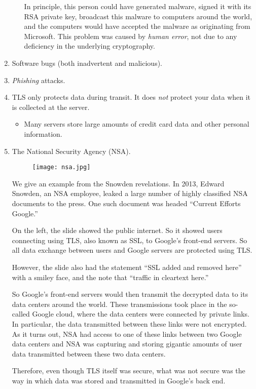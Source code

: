 \begin{enumerate}
\begin{itemize}
                        {\color{blue}In principle, this person could have generated malware,
                            signed it with its RSA private key, broadcast this malware to computers around
                            the world, and the computers would have accepted the malware as originating
                            from Microsoft. This problem was caused by \emph{human error}, not due to any
                            deficiency in the underlying cryptography.}
          \end{itemize}
    \item Software bugs (both inadvertent and malicious).
    \item \emph{Phishing} attacks.
    \item TLS only protects data during transit. It does
          \emph{not} protect your data when it is collected at the server.
          \begin{itemize}
              \item Many servers store large amounts of credit card data and other
                    personal information.
          \end{itemize}
    \item The National Security Agency (NSA).

          \begin{figure}[!ht]
              \centering
              \texttt{[image: nsa.jpg]}
          \end{figure}

          {\color{blue} We give an example from the Snowden revelations. In
          2013, Edward Snowden, an NSA employee, leaked a large number of highly
          classified NSA documents to the press. One such document was headed
          ``Current Efforts Google.''

          On the left, the
          slide showed the public internet. So it showed users connecting using TLS, also
          known as SSL, to Google's front-end servers. So all data exchange between
          users and Google servers are protected using TLS.\@

          However, the slide also had the statement ``SSL added and
          removed here'' with a smiley face, and the note that ``traffic in cleartext
          here.''

          So Google's front-end servers would
          then transmit the decrypted data
          to its data centers around the world. These
          transmissions took place in
          the so-called Google cloud, where the data
          centers were connected by private
          links. In particular, the data transmitted
          between these links were not
          encrypted. As it turns out, NSA had access
          to one of these links between
          two Google data centers and NSA was capturing
          and storing gigantic amounts
          of user data transmitted between these two
          data centers.

          Therefore, even though TLS
          itself was secure, what was not secure was
          the way in which data was stored
          and transmitted in Google's back end.}
\end{enumerate}


